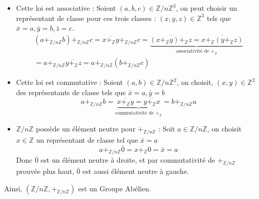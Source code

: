 \documentclass{article}
\begin{document}
\begin{question_kholle}
\begin{itemize}[label=$\star$]
\begin{itemize}[label=$\bullet$]
            \item Cette loi est associative :
                  Soient $(a, b, c) \in \mathbb{Z}/n\mathbb{Z}^{3}$, on peut choisir un représentant de classe pour ces trois classes : $(x,y, z) \in \mathbb{Z}^{3}$ tels que $\bar{x} = a, \bar{y} = b, \bar{z} = c$.
                  \begin{multline*}
                    (a +_{\mathbb{Z}/n\mathbb{Z}} b)+_{\mathbb{Z}/n\mathbb{Z}} c =  \overline{x+_{\mathbb{Z}}y} +_{\mathbb{Z}/n\mathbb{Z}} c = \underbrace{ \overline{(x+_{\mathbb{Z}}y) +_{\mathbb{Z}} z}= \overline{x+_{\mathbb{Z}}(y+_{\mathbb{Z}}z)} }_{ \text{associativité de }+_{\mathbb{Z}} } \\
                    =  a +_{\mathbb{Z}/n\mathbb{Z}}\overline{y +_{\mathbb{Z}} z} = a +_{\mathbb{Z}/n\mathbb{Z}} (b +_{\mathbb{Z}/n\mathbb{Z}} c)
                  \end{multline*}
            \item Cette loi est commutative :
                  Soient $(a, b) \in \mathbb{Z}/n\mathbb{Z}^{2}$, on choisit, $(x, y) \in \mathbb{Z}^{2}$ des représentants de classe tels que $\bar{x} = a, \bar{y} = b$
                  $$
                    a+_{\mathbb{Z}/n\mathbb{Z}}b = \underbrace{ \overline{x +_{\mathbb{Z}} y} = \overline{y+_{\mathbb{Z}}x} }_{ \text{commutativité de } +_{\mathbb{Z}} } = b +_{\mathbb{Z}/n\mathbb{Z}}a
                  $$
            \item $\mathbb{Z}/n\mathbb{Z}$ possède un élément neutre pour $+_{\mathbb{Z}/n\mathbb{Z}}$ :
                  Soit $a \in \mathbb{Z}/n\mathbb{Z}$, on choisit $x \in \mathbb{Z}$ un représentant de classe tel que $\bar{x} = a$
                  $$
                    a +_{\mathbb{Z}/n\mathbb{Z}} \bar{0} = \overline{x+_{\mathbb{Z}}0} = \bar{x} = a
                  $$
                  Donc $\bar{0}$ est un élément neutre à droite, et par commutativité de $+_{\mathbb{Z}/n\mathbb{Z}}$ prouvée plus haut, $\bar{0}$ est aussi élément neutre à gauche.
          \end{itemize}
          Ainsi, $(\mathbb{Z}/n\mathbb{Z}, +_{\mathbb{Z}/n\mathbb{Z}})$ est un Groupe Abélien.
  \end{itemize}
\end{question_kholle}
\end{document}
